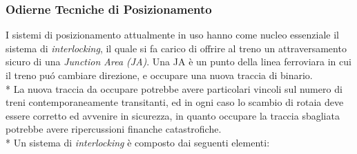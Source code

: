 \subsubsection{Odierne Tecniche di Posizionamento}
I sistemi di posizionamento attualmente in uso hanno come nucleo essenziale il sistema di \emph{interlocking}, il quale si fa carico di offrire al treno un attraversamento sicuro di una \emph{Junction Area (JA)}. Una JA \`e un punto della linea ferroviara in cui il treno pu\'o cambiare direzione, e occupare una nuova traccia di binario.\\*
La nuova traccia da occupare potrebbe avere particolari vincoli sul numero di treni contemporaneamente transitanti, ed in ogni caso lo scambio di rotaia deve essere corretto ed avvenire in sicurezza, in quanto occupare la traccia sbagliata potrebbe avere ripercussioni finanche catastrofiche. \cite{marocchini}\\*
Un sistema di \emph{interlocking} \`e composto dai seguenti elementi:
